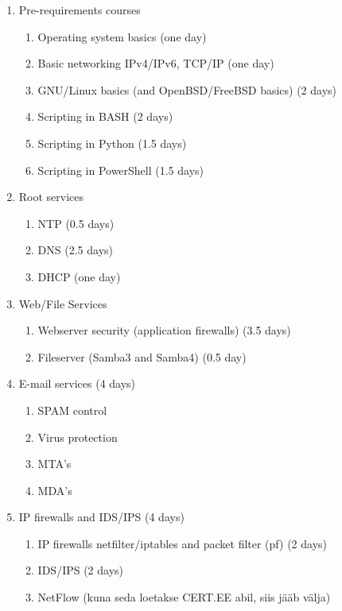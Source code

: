 \begin{enumerate}[label=Hands-on block \arabic*.,leftmargin=*]
  \item Pre-requirements courses
    \begin{enumerate}[label=LAB \arabic*.,leftmargin=*]
  	\item Operating system basics (one day)
  	\item Basic networking IPv4/IPv6, TCP/IP (one day)
  	\item GNU/Linux basics (and OpenBSD/FreeBSD basics) (2 days)
  	\item Scripting in BASH (2 days)
  	\item Scripting in Python (1.5 days)
  	\item Scripting in PowerShell (1.5 days)
  \end{enumerate}
  \item Root services
  \begin{enumerate}[label=LAB \arabic*.,leftmargin=*]
  	\item NTP (0.5 days)
  	\item DNS (2.5 days)
  	\item DHCP (one day)
  \end{enumerate}
  \item Web/File Services
    \begin{enumerate}[label=LAB \arabic*.,leftmargin=*]
  	\item Webserver security (application firewalls) (3.5 days)
  	\item Fileserver (Samba3 and Samba4) (0.5 day)
  \end{enumerate}
    \item E-mail services (4 days)
    \begin{enumerate}[label=LAB \arabic*.,leftmargin=*]
  		\item SPAM control
	  	\item Virus protection
  		\item MTA's 
	  	\item MDA's
    \end{enumerate}
    \item IP firewalls and IDS/IPS (4 days)
        \begin{enumerate}[label=LAB \arabic*.,leftmargin=*]
  		\item IP firewalls netfilter/iptables and packet filter (pf) (2 days)
	  	\item IDS/IPS (2 days)
  		\item NetFlow (kuna seda loetakse CERT.EE abil, siis jääb välja)

\end{enumerate}
\end{enumerate}
